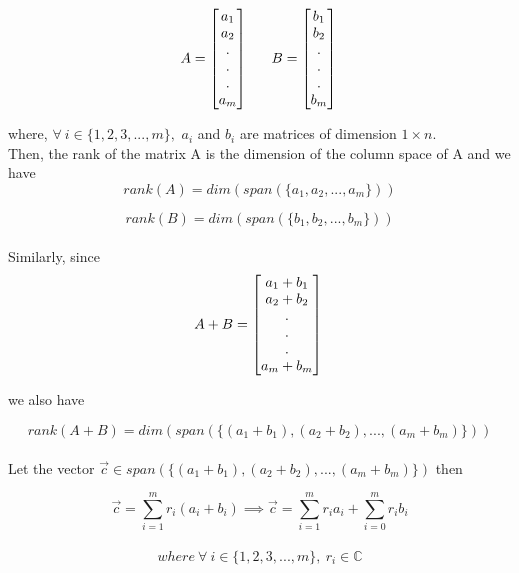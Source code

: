 \documentclass{article}
\begin{document}
$$
    A =
    \left[
    \begin{matrix}
        a_1 \\
        a_2 \\
        .\\
        .\\
        .\\
        a_m\\
    \end{matrix}
    \right]\ \ \ \ \ 
    B =
    \left[
    \begin{matrix}
        b_1 \\
        b_2 \\
        .\\
        .\\
        .\\
        b_m\\
    \end{matrix}
    \right]\\
$$

where, $\forall\ i \in \{1,2,3,...,m\},$ \textbf{$a_i$} and \textbf{$b_i$} are matrices of dimension $1 \times n$.\\

Then, the rank of the matrix A is the dimension of the column space of A and we have 
\[
rank(A) = dim(span(\{a_1, a_2, ..., a_m\})) \tag{1}
\]

\[
rank(B) = dim(span(\{b_1, b_2, ..., b_m\})) \tag{2}
\]\\

Similarly, since
$$
    A + B =
    \left[
    \begin{matrix}
        a_1+b_1 \\
        a_2+b_2 \\
        .\\
        .\\
        .\\
        a_m+b_m\\
    \end{matrix}
    \right]\\
$$

we also have 

\[
rank(A+B) = dim(span(\{(a_1+b_1), (a_2+b_2), ..., (a_m+b_m)\})) \tag{3}
\]\\

Let the vector $\Vec{c} \in span(\{(a_1+b_1), (a_2+b_2), ..., (a_m+b_m)\})$ then

\begin{equation}
\Vec{c} = \sum\limits_{i=1}^{m} r_i(a_i+b_i) \tag{4}
\implies \Vec{c} = \sum\limits_{i=1}^{m} r_ia_i + \sum\limits_{i=0}^{m} r_ib_i
\end{equation}\\
\[
where\ \forall\ i \in \{1,2,3,...,m\},\ r_i \in \mathbb{C}
\]
\newpage
\end{document}
